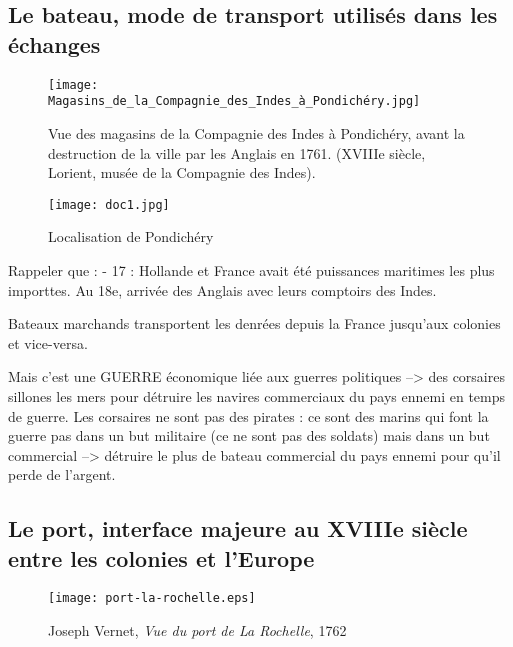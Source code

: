 \documentclass{beamer}
\begin{document}
\subsection{Le bateau, mode de transport utilisés dans les échanges}

\begin{frame}

\begin{figure}
\caption{Vue des magasins de la Compagnie des Indes à Pondichéry, avant la destruction de la ville par les Anglais en 1761. (XVIIIe siècle, Lorient, musée de la Compagnie des Indes).}  
\texttt{[image: Magasins\_de\_la\_Compagnie\_des\_Indes\_à\_Pondichéry.jpg]}

\end{figure}

\end{frame}

\begin{frame}
\begin{figure}
\caption{Localisation de Pondichéry}  
\texttt{[image: doc1.jpg]}
\end{figure}
\end{frame}


\begin{frame}
Rappeler que : 
- 17 : Hollande et France avait été puissances maritimes les plus importtes. Au 18e, arrivée des Anglais avec leurs comptoirs des Indes.

Bateaux marchands transportent les denrées depuis la France jusqu'aux colonies et vice-versa.

Mais c'est une GUERRE économique liée aux guerres politiques --> des corsaires sillones les mers pour détruire les navires commerciaux du pays ennemi en temps de guerre. Les corsaires ne sont pas des pirates : ce sont des marins qui font la guerre pas dans un but militaire (ce ne sont pas des soldats) mais dans un but commercial --> détruire le plus de bateau commercial du pays ennemi pour qu'il perde de l'argent.
\end{frame}


\subsection{Le port, interface majeure au XVIIIe siècle entre les colonies et l'Europe}

\begin{frame}

\begin{figure}
\caption{Joseph Vernet, \textit{Vue du port de La Rochelle}, 1762}  
\texttt{[image: port-la-rochelle.eps]}

\end{figure}
\end{frame}
\end{document}
